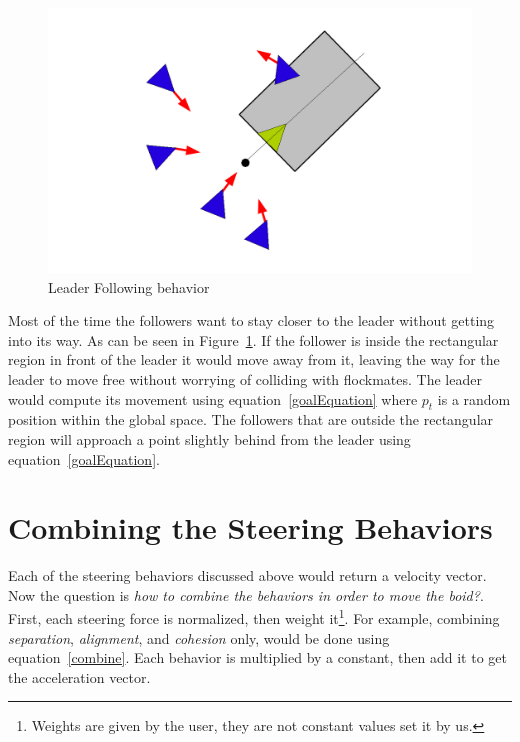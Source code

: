 \begin{figure}[htbp]
\begin{center}
\includegraphics[scale=0.5]{figures/leaderFollowing.pdf}
\caption{Leader Following behavior}
\label{leaderPDF}
\end{center}
\end{figure}

Most of the time the followers want to stay closer to the leader without getting into its way. As can be seen in Figure~\ref{leaderPDF}.  If the follower is inside the rectangular region in front of the leader it would move away from it, leaving the way for the leader to move free without worrying of colliding with flockmates. The leader would compute its movement using equation~\ref{goalEquation} where $p_t$ is a random position within the global space. The followers that are outside the rectangular region will approach a point slightly behind from the leader using equation~\ref{goalEquation}.

\section{Combining the Steering Behaviors}
Each of the steering behaviors discussed above would return a velocity vector. Now the question is \textit{how to combine the behaviors in order to move the boid?}. First, each steering force is normalized, then weight it\footnote{Weights are given by the user, they are not constant values set it by us.}. For example, combining \textit{separation}, \textit{alignment}, and \textit{cohesion} only, would be done using equation~\ref{combine}. Each behavior is multiplied by a constant, then add it to get the acceleration vector.

